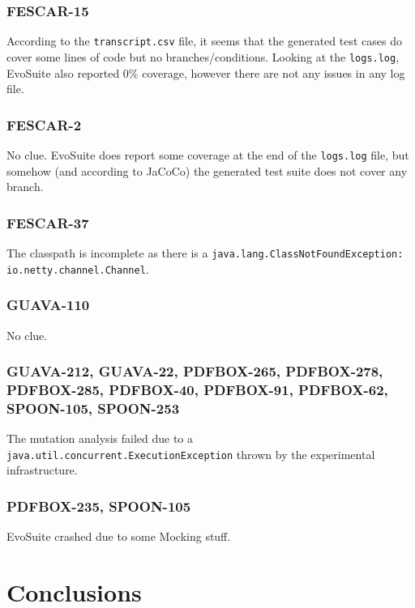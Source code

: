\documentclass[sigconf]{acmart}
\newcommand{\EVOSUITE}{{\sc EvoSuite}\xspace}
\begin{document}

\subsubsection*{FESCAR-15} According to the \texttt{transcript.csv} file, it
seems that the generated test cases do cover some lines of code but no
branches/conditions.  Looking at the \texttt{logs.log}, \EVOSUITE also reported
0\% coverage, however there are not any issues in any log file.


\subsubsection*{FESCAR-2} No clue.  \EVOSUITE does report some coverage at the
end of the \texttt{logs.log} file, but somehow (and according to JaCoCo) the
generated test suite does not cover any branch.


\subsubsection*{FESCAR-37} The classpath is incomplete as there is a
\texttt{java.lang.ClassNotFoundException: io.netty.channel.Channel}.


\subsubsection*{GUAVA-110} No clue.


\subsubsection*{GUAVA-212, GUAVA-22, PDFBOX-265, PDFBOX-278, PDFBOX-285,
PDFBOX-40, PDFBOX-91, PDFBOX-62, SPOON-105, SPOON-253} The mutation analysis
failed due to a \texttt{java.util.concurrent.ExecutionException} thrown by the
experimental infrastructure.


\subsubsection*{PDFBOX-235, SPOON-105} \EVOSUITE crashed due to some Mocking stuff.


\section{Conclusions}



\end{document}
